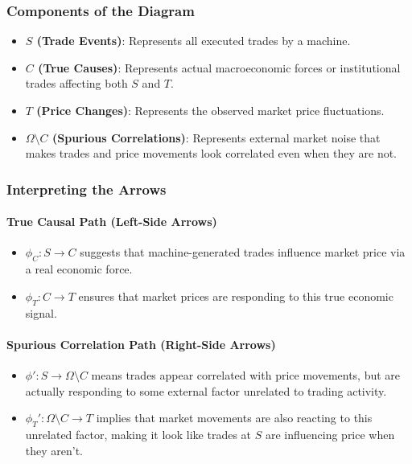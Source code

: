 \subsubsection*{Components of the Diagram}

\begin{itemize}
    \item \textbf{\( S \) (Trade Events)}: Represents all executed trades by a machine.
    \item \textbf{\( C \) (True Causes)}: Represents actual macroeconomic forces or institutional trades affecting both \( S \) and \( T \).
    \item \textbf{\( T \) (Price Changes)}: Represents the observed market price fluctuations.
    \item \textbf{\( \Omega \setminus C \) (Spurious Correlations)}: Represents external market noise that makes trades and price movements look correlated even when they are not.
\end{itemize}

\subsubsection*{Interpreting the Arrows}

\paragraph{True Causal Path (Left-Side Arrows)}
\begin{itemize}
    \item \( \phi_C: S \to C \) suggests that machine-generated trades influence market price via a real economic force.
    \item \( \phi_T: C \to T \) ensures that market prices are responding to this true economic signal.
\end{itemize}

\paragraph{Spurious Correlation Path (Right-Side Arrows)}
\begin{itemize}
    \item \( \phi': S \to \Omega \setminus C \) means trades appear correlated with price movements, but are actually responding to some external factor unrelated to trading activity.
    \item \( \phi_T': \Omega \setminus C \to T \) implies that market movements are also reacting to this unrelated factor, making it look like trades at \( S \) are influencing price when they aren’t.
\end{itemize}

